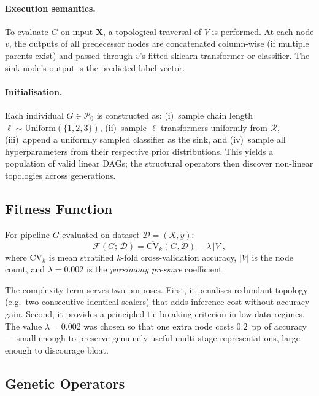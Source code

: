 \documentclass{article}
\theoremstyle{definition}
\theoremstyle{plain}
\theoremstyle{remark}
\begin{document}
\paragraph{Execution semantics.}
To evaluate $G$ on input $\mathbf{X}$, a topological traversal of $V$ is
performed.
At each node $v$, the outputs of all predecessor nodes are concatenated
column-wise (if multiple parents exist) and passed through $v$'s fitted
sklearn transformer or classifier.
The sink node's output is the predicted label vector.

\paragraph{Initialisation.}
Each individual $G \in \mathcal{P}_0$ is constructed as:
(i)~sample chain length $\ell \sim \mathrm{Uniform}(\{1,2,3\})$,
(ii)~sample $\ell$ transformers uniformly from $\mathcal{R}$,
(iii)~append a uniformly sampled classifier as the sink, and
(iv)~sample all hyperparameters from their respective prior distributions.
This yields a population of valid linear DAGs; the structural operators
then discover non-linear topologies across generations.

\subsection{Fitness Function}

For pipeline $G$ evaluated on dataset $\mathcal{D} = (X, y)$:
\begin{equation}
  \mathcal{F}(G;\,\mathcal{D})
    = \overline{\mathrm{CV}}_k(G,\mathcal{D}) - \lambda\,|V|,
  \label{eq:fitness}
\end{equation}
where $\overline{\mathrm{CV}}_k$ is mean stratified $k$-fold cross-validation
accuracy, $|V|$ is the node count, and $\lambda = 0.002$ is the
\emph{parsimony pressure} coefficient.

The complexity term serves two purposes.
First, it penalises redundant topology (e.g.\ two consecutive identical
scalers) that adds inference cost without accuracy gain.
Second, it provides a principled tie-breaking criterion in low-data regimes.
The value $\lambda = 0.002$ was chosen so that one extra node costs $0.2$~pp
of accuracy — small enough to preserve genuinely useful multi-stage
representations, large enough to discourage bloat.

\subsection{Genetic Operators}
\label{sec:operators}
\end{document}
